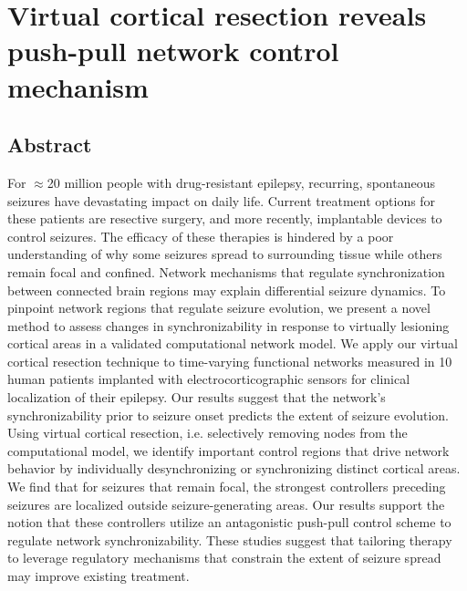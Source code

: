 \chapter{Virtual cortical resection reveals push-pull network control mechanism}
\label{ch:selfreg}

\ifpdf
    \graphicspath{{chapters/ch5_figures/PNG/}{chapters/ch5_figures/PDF/}{chapters/ch5_figures/}}
\else
    \graphicspath{{chapters/ch5_figures/EPS/}{chapters/ch5_figures/}}
\fi


\section{Abstract}
For $\approx$20 million people with drug-resistant epilepsy, recurring, spontaneous seizures have devastating impact on daily life. Current treatment options for these patients are resective surgery, and more recently, implantable devices to control seizures. The efficacy of these therapies is hindered by a poor understanding of why some seizures spread to surrounding tissue while others remain focal and confined. Network mechanisms that regulate synchronization between connected brain regions may explain differential seizure dynamics. To pinpoint network regions that regulate seizure evolution, we present a novel method to assess changes in synchronizability in response to virtually lesioning cortical areas in a validated computational network model. We apply our virtual cortical resection technique to time-varying functional networks measured in 10 human patients implanted with electrocorticographic sensors for clinical localization of their epilepsy. Our results suggest that the network's synchronizability prior to seizure onset predicts the extent of seizure evolution. Using virtual cortical resection, i.e. selectively removing nodes from the computational model, we identify important control regions that drive network behavior by individually desynchronizing or synchronizing distinct cortical areas. We find that for seizures that remain focal, the strongest controllers preceding seizures are localized outside seizure-generating areas. Our results support the notion that these controllers utilize an antagonistic push-pull control scheme to regulate network synchronizability. These studies suggest that tailoring therapy to leverage regulatory mechanisms that constrain the extent of seizure spread may improve existing treatment. 


